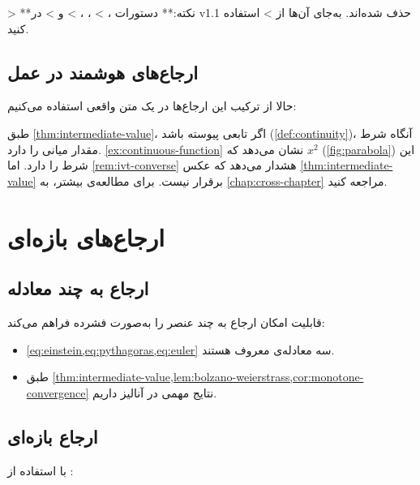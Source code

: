 \documentclass{matinbook}
\begin{document}
> **نکته:** دستورات ،
> ، ،
>  و 
> در v1.1 حذف شده‌اند. به‌جای آن‌ها از 
> استفاده کنید.

\section{ارجاع‌های هوشمند در عمل}
\label{sec:ref-in-practice}

حالا از ترکیب این ارجاع‌ها در یک متن واقعی استفاده می‌کنیم:

\medskip

طبق \cref{thm:intermediate-value}، اگر تابعی پیوسته باشد
(\cref{def:continuity})، آنگاه شرط مقدار میانی را دارد.
\cref{ex:continuous-function} نشان می‌دهد که $x^{2}$
(\cref{fig:parabola}) این شرط را دارد. اما
\cref{rem:ivt-converse} هشدار می‌دهد که عکس
\cref{thm:intermediate-value} برقرار نیست. برای مطالعه‌ی
بیشتر، به \cref{chap:cross-chapter} مراجعه کنید.

\chapter{ارجاع‌های بازه‌ای}
\label{chap:range-refs}

\section{ارجاع به چند معادله}
\label{sec:range-multiple}

قابلیت  امکان ارجاع به چند عنصر را
به‌صورت فشرده فراهم می‌کند:

\begin{itemize}
    \item \cref{eq:einstein,eq:pythagoras,eq:euler}
    سه معادله‌ی معروف هستند.
    \item طبق \cref{thm:intermediate-value,lem:bolzano-weierstrass,cor:monotone-convergence}
    نتایج مهمی در آنالیز داریم.
\end{itemize}

\section{ارجاع بازه‌ای}
\label{sec:range-range}

با استفاده از :
\end{document}
